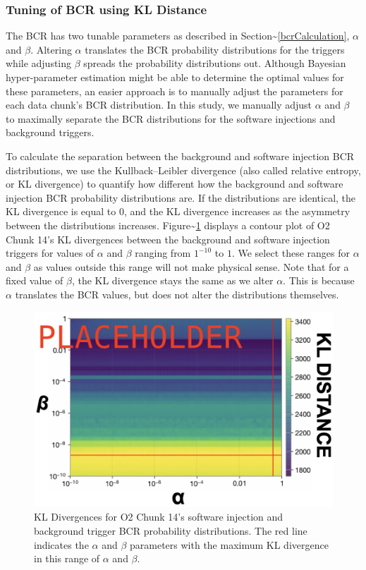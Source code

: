 \documentclass[%
 reprint,
 amsmath,amssymb,
 aps,
]{revtex4}
\begin{document}
\hypertarget{tuning-of-bcr-using-kl-distance}{%
\subsubsection{Tuning of BCR using KL Distance}\label{tuning-of-bcr-using-kl-distance}}

The BCR has two tunable parameters as described in Section\textasciitilde\ref{bcrCalculation},
\(\alpha\) and \(\beta\). Altering \(\alpha\) translates the BCR probability distributions for
the triggers while adjusting \(\beta\) spreads the probability distributions out. Although
Bayesian hyper-parameter estimation might be able to determine the optimal values for
these parameters, an easier approach is to manually adjust the parameters for each data
chunk's BCR distribution. In this study, we manually adjust \(\alpha\) and \(\beta\) to
maximally separate the BCR distributions for the software injections and background
triggers.

To calculate the separation between the background and software injection BCR
distributions, we use the Kullback--Leibler divergence (also called relative entropy, or
KL divergence) to quantify how different how the background and software injection BCR
probability distributions are. If the distributions are identical, the KL divergence is
equal to 0, and the KL divergence increases as the asymmetry between the distributions
increases. Figure\textasciitilde\ref{fig:klDivGrid} displays a contour plot of O2 Chunk 14's KL
divergences between the background and software injection triggers for values of
\(\alpha\) and \(\beta\) ranging from \(1^{-10}\) to \(1\). We select these ranges for \(\alpha\)
and \(\beta\) as values outside this range will not make physical sense. Note that for a
fixed value of \(\beta\), the KL divergence stays the same as we alter \(\alpha\). This is
because \(\alpha\) translates the BCR values, but does not alter the distributions
themselves.



\begin{figure}[!h]

{\centering \includegraphics[width=0.75\linewidth]{images/kl_divergence_grid} 

}

\caption[KL Divergence grid for both BCR tunable parameters]{KL Divergences for O2 Chunk 14's software injection and background trigger BCR probability distributions. The red line indicates the \(\alpha\) and \(\beta\) parameters with the maximum KL divergence in this range of \(\alpha\) and \(\beta\).}\label{fig:klDivGrid}
\end{figure}
\end{document}
